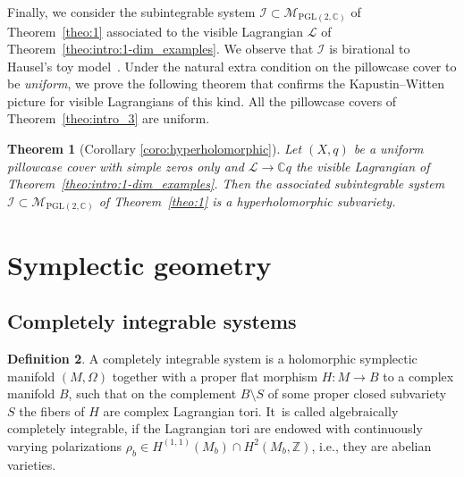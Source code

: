 \documentclass[10pt,a4paper]{amsart}
\numberwithin{equation}{section}
\newtheorem{theo}{Theorem}[section]
\theoremstyle{definition}
\newtheorem{defi}[theo]{Definition}
\renewcommand{\to}{\rightarrow}
\newcommand{\calI}{\mathcal{I}}
\newcommand{\calL}{\mathcal{L}}
\newcommand{\calM}{\mathcal{M}}
\newcommand{\ZZ}{\mathbb{Z}}
\newcommand{\CC}{\mathbb{C}}
\newcommand{\PGL}{\mathrm{PGL}}
\begin{document}
Finally, we consider the subintegrable system $\calI \subset \calM_{\PGL(2,\CC)}$ of Theorem~\ref{theo:1} associated to the visible Lagrangian $\calL$ of Theorem~\ref{theo:intro:1-dim_examples}. We observe that $\calI$ is birational to Hausel's toy model~\cite{HauselToy}. Under the natural extra condition on the pillowcase cover to be \textit{uniform}, we prove the following theorem that confirms the Kapustin--Witten picture for visible Lagrangians of this kind. All the pillowcase covers of Theorem~\ref{theo:intro_3} are uniform.

\begin{theo}[{Corollary \ref{coro:hyperholomorphic}}]
 Let $(X,q)$ be a uniform pillowcase cover with simple zeros only and $\calL \to \CC q$ the visible Lagrangian of Theorem~{\rm \ref{theo:intro:1-dim_examples}}. Then the associated subintegrable system $\calI \subset \calM_{\PGL(2,\CC)}$ of Theorem~{\rm \ref{theo:1}} is a hyperholomorphic subvariety.
\end{theo}

\section{Symplectic geometry}
\subsection{Completely integrable systems}
\begin{defi}\label{defi:integrable_system} A completely integrable system is a holomorphic symplectic manifold $(M,\Omega)$ together with a proper flat morphism $H\colon M \to B$ to a complex manifold $B$, such that on the complement $B\setminus S$ of some proper closed subvariety $S$ the fibers of $H$ are complex Lagrangian tori. It~is called algebraically completely integrable, if the Lagrangian tori are endowed with continuously varying polarizations $\rho_b \in H^{(1,1)}(M_b) \cap H^2(M_b,\ZZ)$, i.e., they are abelian varieties.
\end{defi}
\end{document}
